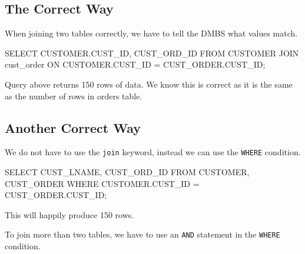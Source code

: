 \subsection*{The Correct Way}
When joining two tables correctly, we have to tell the DMBS what values match.
\begin{sql}
SELECT CUSTOMER.CUST_ID, CUST_ORD_ID FROM CUSTOMER JOIN cust_order ON CUSTOMER.CUST_ID = CUST_ORDER.CUST_ID;
\end{sql}
Query above returns 150 rows of data. We know this is correct as it is the same as the number of rows in orders table.

\subsection*{Another Correct Way}
We do not have to use the \texttt{join} keyword, instead we can use the \texttt{WHERE} condition.
\begin{sql}
SELECT CUST_LNAME, CUST_ORD_ID FROM CUSTOMER, CUST_ORDER WHERE CUSTOMER.CUST_ID = CUST_ORDER.CUST_ID;
\end{sql}
This will happily produce 150 rows.

To join more than two tables, we have to use an \texttt{AND} statement in the \texttt{WHERE} condition.
